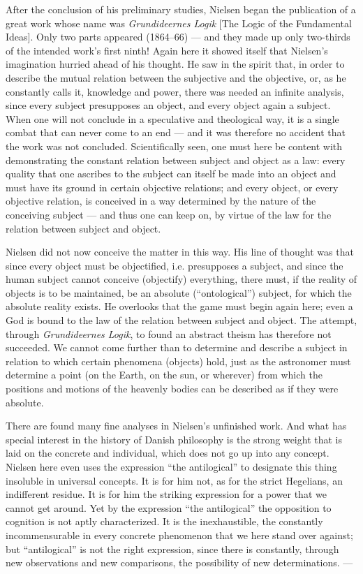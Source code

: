 \documentclass[12pt,a4paper]{book}
\newcommand{\opage}[1]{\marginnote{\footnotesize\textit{[#1]}}}
\begin{document}
After the conclusion of his preliminary studies, Nielsen began the publication of a great work
whose name was \emph{Grundideernes Logik} [The Logic of the Fundamental Ideas]. Only two parts
appeared (1864--66) --- and they made up only two-thirds of the intended work's first ninth!
Again here it showed itself that Nielsen's imagination hurried ahead of his thought. He saw in
the spirit that, in order to describe the mutual relation between the subjective and the
objective, or, as he constantly calls it, knowledge and power, there was needed an infinite
analysis, since every subject presupposes an object, and every object again a subject. When one
will not conclude in a speculative and theological way, it is a single combat that can never
come to an end --- and it was therefore no accident that the work was not concluded.
Scientifically seen, one must here be content with demonstrating the constant relation between
subject and object as a law: every quality that one ascribes to the subject can itself be made
into an object and must have its \opage{190}ground in certain objective relations; and every object, or
every objective relation, is conceived in a way determined by the nature of the conceiving
subject --- and thus one can keep on, by virtue of the law for the relation between subject and
object.

Nielsen did not now conceive the matter in this way. His line of thought was that since every
object must be objectified, i.e. presupposes a subject, and since the human subject cannot
conceive (objectify) everything, there must, if the reality of objects is to be maintained, be
an absolute (``ontological'') subject, for which the absolute reality exists. He overlooks that
the game must begin again here; even a God is bound to the law of the relation between subject
and object. The attempt, through \emph{Grundideernes Logik}, to found an abstract theism has
therefore not succeeded. We cannot come further than to determine and describe a subject in
relation to which certain phenomena (objects) hold, just as the astronomer must determine a
point (on the Earth, on the sun, or wherever) from which the positions and motions of the
heavenly bodies can be described as if they were absolute.

There are found many fine analyses in Nielsen's unfinished work. And what has special interest
in the history of Danish philosophy is the strong weight that is laid on the concrete and
individual, which does not go up into any concept. Nielsen here even uses the expression ``the
antilogical'' to designate this thing insoluble in universal concepts. It is for him not, as
for the strict Hegelians, an indifferent residue. It is for him the striking expression for a
power that we cannot get around. Yet by the expression ``the antilogical'' the opposition to
cognition is not aptly characterized. It is the inexhaustible, the constantly incommensurable
in every concrete phenomenon that we here stand over against; but ``antilogical'' is not the
right expression, since there is constantly, through new observations and new comparisons, the
possibility of new determinations. ---
\end{document}
